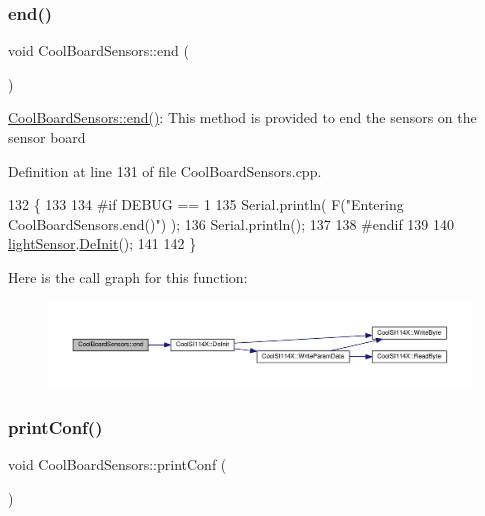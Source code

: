 \subsubsection{\texorpdfstring{end()}{end()}}
{\footnotesize\ttfamily void Cool\+Board\+Sensors\+::end (\begin{DoxyParamCaption}{ }\end{DoxyParamCaption})}

\hyperlink{class_cool_board_sensors_a4902b69f6e628bd6557193758fdd2bae}{Cool\+Board\+Sensors\+::end()}\+: This method is provided to end the sensors on the sensor board 

Definition at line 131 of file Cool\+Board\+Sensors.\+cpp.


\begin{DoxyCode}
132 \{
133 
134 \textcolor{preprocessor}{#if DEBUG == 1  }
135     Serial.println( F(\textcolor{stringliteral}{"Entering CoolBoardSensors.end()"}) );
136     Serial.println();
137 
138 \textcolor{preprocessor}{#endif}
139 
140     \hyperlink{class_cool_board_sensors_ac711c27d0927eb5e73be77f092c48be0}{lightSensor}.\hyperlink{class_cool_s_i114_x_a6840abd53a2e3d71a6bb918077c6d6e6}{DeInit}();
141 
142 \}
\end{DoxyCode}
Here is the call graph for this function\+:\nopagebreak
\begin{figure}[H]
\begin{center}
\leavevmode
\includegraphics[width=350pt]{de/d46/class_cool_board_sensors_a4902b69f6e628bd6557193758fdd2bae_cgraph}
\end{center}
\end{figure}
\mbox{\label{class_cool_board_sensors_af6fd79505815b204c178617ecf54c873}} 
\subsubsection{\texorpdfstring{print\+Conf()}{printConf()}}
{\footnotesize\ttfamily void Cool\+Board\+Sensors\+::print\+Conf (\begin{DoxyParamCaption}{ }\end{DoxyParamCaption})}


